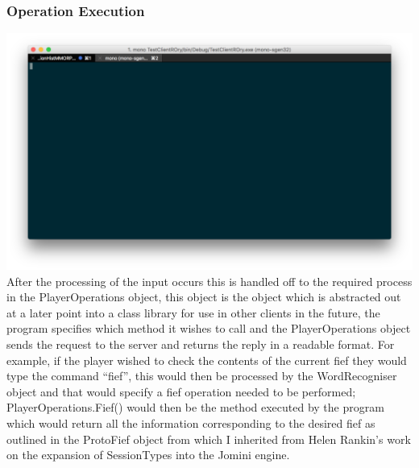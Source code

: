 \documentclass{article}
\begin{document}
\subsubsection{Operation Execution}
\includegraphics[width=\textwidth]{text2.png}
After the processing of the input occurs this is handled off to the required process in the PlayerOperations object, this object is the object which is abstracted out at a later point into a class library for use in other clients in the future, the program specifies which method it wishes to call and the PlayerOperations object sends the request to the server and returns the reply in a readable format. For example, if the player wished to check the contents of the current fief they would type the command “fief”, this would then be processed by the WordRecogniser object and that would specify a fief operation needed to be performed; PlayerOperations.Fief() would then be the method executed by the program which would return all the information corresponding to the desired fief as outlined in the ProtoFief object from which I inherited from Helen Rankin’s work on the expansion of SessionTypes into the Jomini engine.
\end{document}
